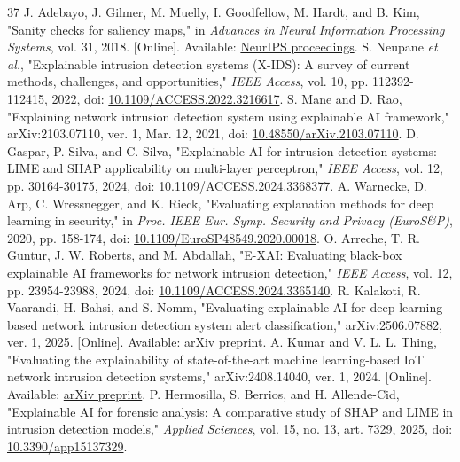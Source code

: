 \documentclass[conference,letterpaper]{IEEEtran}
\begin{document}
\begin{thebibliography}{37}
 J. Adebayo, J. Gilmer, M. Muelly, I. Goodfellow, M. Hardt, and B. Kim, "Sanity checks for saliency maps," in \emph{Advances in Neural Information Processing Systems}, vol. 31, 2018. [Online]. Available: \href{https://proceedings.neurips.cc/paper/2018/hash/294a8ed24b1ad22ec2e7efea049b8737-Abstract.html}{NeurIPS proceedings}.
 S. Neupane \emph{et al.}, "Explainable intrusion detection systems (X-IDS): A survey of current methods, challenges, and opportunities," \emph{IEEE Access}, vol. 10, pp. 112392-112415, 2022, doi: \href{https://doi.org/10.1109/ACCESS.2022.3216617}{10.1109/ACCESS.2022.3216617}.
 S. Mane and D. Rao, "Explaining network intrusion detection system using explainable AI framework," arXiv:2103.07110, ver. 1, Mar. 12, 2021, doi: \href{https://doi.org/10.48550/arXiv.2103.07110}{10.48550/arXiv.2103.07110}.
 D. Gaspar, P. Silva, and C. Silva, "Explainable AI for intrusion detection systems: LIME and SHAP applicability on multi-layer perceptron," \emph{IEEE Access}, vol. 12, pp. 30164-30175, 2024, doi: \href{https://doi.org/10.1109/ACCESS.2024.3368377}{10.1109/ACCESS.2024.3368377}.
 A. Warnecke, D. Arp, C. Wressnegger, and K. Rieck, "Evaluating explanation methods for deep learning in security," in \emph{Proc. IEEE Eur. Symp. Security and Privacy (EuroS\&P)}, 2020, pp. 158-174, doi: \href{https://doi.org/10.1109/EuroSP48549.2020.00018}{10.1109/EuroSP48549.2020.00018}.
 O. Arreche, T. R. Guntur, J. W. Roberts, and M. Abdallah, "E-XAI: Evaluating black-box explainable AI frameworks for network intrusion detection," \emph{IEEE Access}, vol. 12, pp. 23954-23988, 2024, doi: \href{https://doi.org/10.1109/ACCESS.2024.3365140}{10.1109/ACCESS.2024.3365140}.
 R. Kalakoti, R. Vaarandi, H. Bahsi, and S. Nomm, "Evaluating explainable AI for deep learning-based network intrusion detection system alert classification," arXiv:2506.07882, ver. 1, 2025. [Online]. Available: \href{https://arxiv.org/abs/2506.07882v1}{arXiv preprint}.
 A. Kumar and V. L. L. Thing, "Evaluating the explainability of state-of-the-art machine learning-based IoT network intrusion detection systems," arXiv:2408.14040, ver. 1, 2024. [Online]. Available: \href{https://arxiv.org/abs/2408.14040v1}{arXiv preprint}.
 P. Hermosilla, S. Berrios, and H. Allende-Cid, "Explainable AI for forensic analysis: A comparative study of SHAP and LIME in intrusion detection models," \emph{Applied Sciences}, vol. 15, no. 13, art. 7329, 2025, doi: \href{https://doi.org/10.3390/app15137329}{10.3390/app15137329}.

\end{thebibliography}
\end{document}
